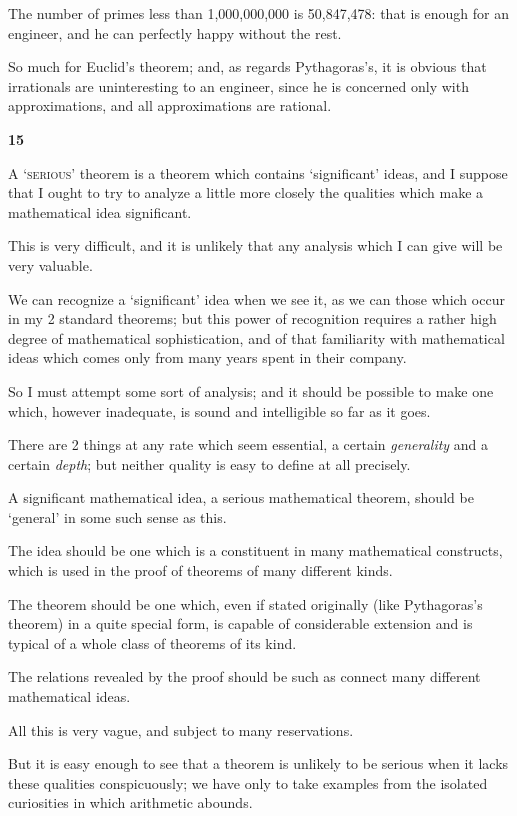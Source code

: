 \documentclass{article}
\numberwithin{equation}{section}
\begin{document}
The number of primes less than 1,000,000,000 is 50,847,478: that is enough for an engineer, and he can perfectly happy without the rest.

So much for Euclid's theorem; and, as regards Pythagoras's, it is obvious that irrationals are uninteresting to an engineer, since he is concerned only with approximations, and all approximations are rational.

\begin{center}
    \large\textbf{15}
\end{center}
\textsc{A `serious'} theorem is a theorem which contains `significant' ideas, and I suppose that I ought to try to analyze a little more closely the qualities which make a mathematical idea significant.

This is very difficult, and it is unlikely that any analysis which I can give will be very valuable.

We can recognize a `significant' idea when we see it, as we can those which occur in my 2 standard theorems; but this power of recognition requires a rather high degree of mathematical sophistication, and of that familiarity with mathematical ideas which comes only from many years spent in their company.

So I must attempt some sort of analysis; and it should be possible to make one which, however inadequate, is sound and intelligible so far as it goes.

There are 2 things at any rate which seem essential, a certain \textit{generality} and a certain \textit{depth}; but neither quality is easy to define at all precisely.

%
A significant mathematical idea, a serious mathematical theorem, should be `general' in some such sense as this.

The idea should be one which is a constituent in many mathematical constructs, which is used in the proof of theorems of many different kinds.

The theorem should be one which, even if stated originally (like Pythagoras's theorem) in a quite special form, is capable of considerable extension and is typical of a whole class of theorems of its kind.

The relations revealed by the proof should be such as connect many different mathematical ideas.

All this is very vague, and subject to many reservations.

But it is easy enough to see that a theorem is unlikely to be serious when it lacks these qualities conspicuously; we have only to take examples from the isolated curiosities in which arithmetic abounds.
\end{document}
